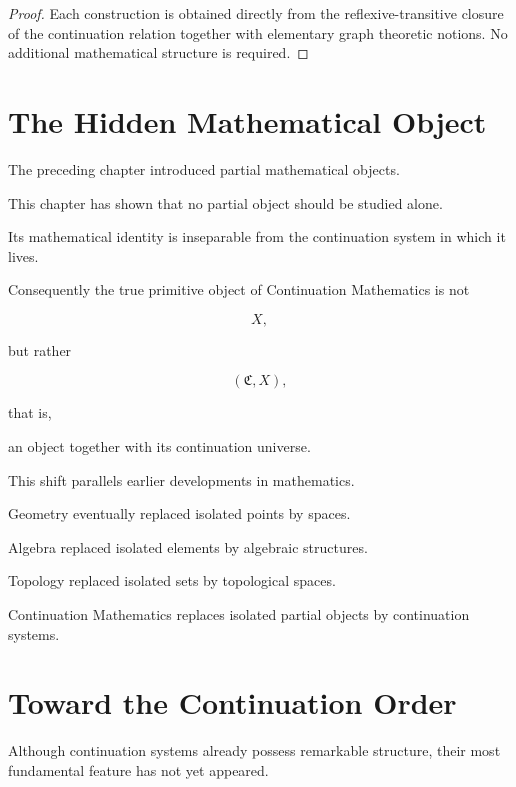 \documentclass[13pt,openany]{book}
\theoremstyle{plain}
\theoremstyle{definition}
\begin{document}
\begin{proof}
Each construction is obtained directly from the reflexive-transitive
closure of the continuation relation together with elementary graph
theoretic notions. No additional mathematical structure is required.
\end{proof}

\section{The Hidden Mathematical Object}

The preceding chapter introduced partial mathematical objects.

This chapter has shown that no partial object should be studied alone.

Its mathematical identity is inseparable from the continuation system in
which it lives.

Consequently the true primitive object of Continuation Mathematics is not

\[
X,
\]

but rather

\[
(\mathfrak C,X),
\]

that is,

an object together with its continuation universe.

This shift parallels earlier developments in mathematics.

Geometry eventually replaced isolated points by spaces.

Algebra replaced isolated elements by algebraic structures.

Topology replaced isolated sets by topological spaces.

Continuation Mathematics replaces isolated partial objects by continuation
systems.

\section{Toward the Continuation Order}

Although continuation systems already possess remarkable structure, their
most fundamental feature has not yet appeared.
\end{document}
